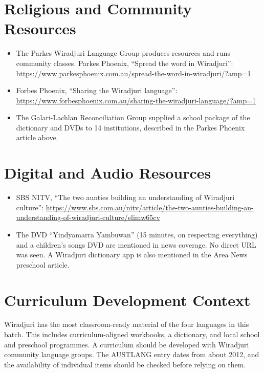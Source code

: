 \documentclass[12pt]{article}
\begin{document}
\section{Religious and Community Resources}
\begin{itemize}
\item The Parkes Wiradjuri Language Group produces resources and runs community classes. Parkes Phoenix, ``Spread the word in Wiradjuri'': \url{https://www.parkesphoenix.com.au/spread-the-word-in-wiradjuri/?amp=1}
\item Forbes Phoenix, ``Sharing the Wiradjuri language'': \url{https://www.forbesphoenix.com.au/sharing-the-wiradjuri-language/?amp=1}
\item The Galari-Lachlan Reconciliation Group supplied a school package of the dictionary and DVDs to 14 institutions, described in the Parkes Phoenix article above.
\end{itemize}

\section{Digital and Audio Resources}
\begin{itemize}
\item SBS NITV, ``The two aunties building an understanding of Wiradjuri culture'': \url{https://www.sbs.com.au/nitv/article/the-two-aunties-building-an-understanding-of-wiradjuri-culture/elimw65cv}
\item The DVD ``Yindyamarra Yambuwan'' (15 minutes, on respecting everything) and a children's songs DVD are mentioned in news coverage. No direct URL was seen. A Wiradjuri dictionary app is also mentioned in the Area News preschool article.
\end{itemize}

\section{Curriculum Development Context}
Wiradjuri has the most classroom-ready material of the four languages in this batch. This includes curriculum-aligned workbooks, a dictionary, and local school and preschool programmes. A curriculum should be developed with Wiradjuri community language groups. The AUSTLANG entry dates from about 2012, and the availability of individual items should be checked before relying on them.
\end{document}
